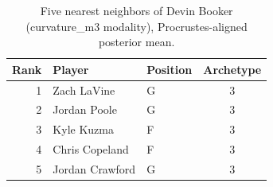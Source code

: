 \begin{table}[htbp]
  \centering\small
  \begin{tabular}{rllc}
    \toprule
    Rank & Player & Position & Archetype \\
    \midrule
    1 & Zach LaVine & G & 3 \\
    2 & Jordan Poole & G & 3 \\
    3 & Kyle Kuzma & F & 3 \\
    4 & Chris Copeland & F & 3 \\
    5 & Jordan Crawford & G & 3 \\
    \bottomrule
  \end{tabular}
  \caption{Five nearest neighbors of Devin Booker (curvature_m3 modality), Procrustes-aligned posterior mean.}
  \label{tab:Devin_Booker_neighbors_curvature_m3}
\end{table}

